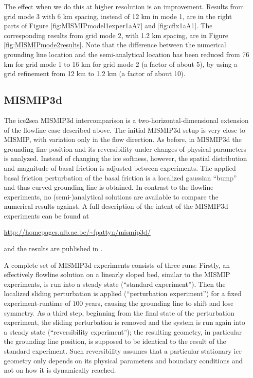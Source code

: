 The effect when we do this at higher resolution is an improvement.  Results from grid mode 3 with 6 km spacing, instead of 12 km in mode 1, are in the right parts of Figure \ref{fig:MISMIPmodel1exper1aA7} and \ref{fig:cflx1aA1}.  The corresponding results from grid mode 2, with 1.2 km spacing, are in Figure \ref{fig:MISMIPmode2results}.  Note that the difference between the numerical grounding line location and the semi-analytical location has been reduced from 76 km for grid mode 1 to 16 km for grid mode 2 (a factor of about 5), by using a grid refinement from 12 km to 1.2 km (a factor of about 10).


\subsection{MISMIP3d}\label{subsect:MISMIP3d}
The ice2sea MISMIP3d intercomparison is a two-horizontal-dimensional extension of the flowline case described above.  The initial MISMIP3d setup is very close to MISMIP, with variation only in the flow direction.  As before, in MISMIP3d the grounding line position and its reversibility under changes of physical parameters is analyzed.  Instead of changing the ice softness, however, the spatial distribution and magnitude of basal friction is adjusted between experiments.  The applied basal friction perturbation of the basal friction is a localized gaussian ``bump'' and thus curved grounding line is obtained.  In contrast to the flowline experiments, no (semi-)analytical solutions are available to compare the numerical results against.  A full description of the intent of the MISMIP3d experiments can be found at

\centerline{\url{http://homepages.ulb.ac.be/~fpattyn/mismip3d/}}

\noindent and the results are published in \cite{MISMIP3d013}.

A complete set of MISMIP3d experiments consists of three runs: Firstly, an effectively flowline solution on a linearly sloped bed, similar to the MISMIP experiments, is run into a steady state (``standard experiment''). Then the localized sliding perturbation is applied (``perturbation experiment'') for a fixed experiment-runtime of $100$ years, causing the grounding line to shift and lose symmetry.  As a third step, beginning from the final state of the perturbation experiment, the sliding perturbation is removed and the system is run again into a steady state (``reversibility experiment''); the resulting geometry, in particular the grounding line position, is supposed to be identical to the result of the standard experiment.  Such reversibility assumes that a particular stationary ice geometry only depends on its physical parameters and boundary conditions and not on how it is dynamically reached.


